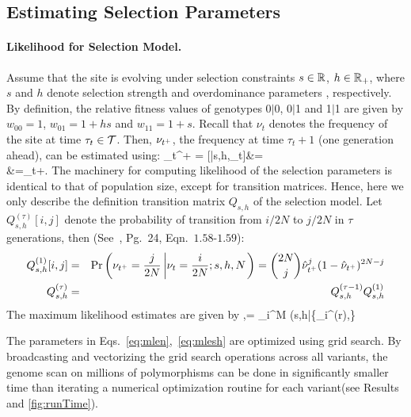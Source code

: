 \subsection{Estimating Selection Parameters}

\paragraph{Likelihood for Selection Model.}
Assume that the site is evolving under selection constraints $s\in
{\mathbb R}$, $h\in {\mathbb R}_+$, where $s$ and $h$ denote selection strength and 
overdominance parameters ,
respectively. By definition, the relative fitness values of genotypes
0$|$0, 0$|$1 and 1$|$1 are given by $w_{00}=1$, $w_{01}=1+hs$ and
$w_{11}=1+s$. Recall that $\nu_t$ denotes the frequency of the site at
time $\tau_t\in {\cal T}$. Then, $\nu_{t^+}$, the frequency at time
$\tau_{t}+1$ (one generation ahead), can be estimated using: 
\beq 
\hat{\nu}_{t^+} =
[\nusp|s,h,\nu_t]&=\\
&=\nu_t+.
  \label{eq:transition}
\eeq
The machinery for computing likelihood of the selection parameters is 
identical to that of population size, except for transition matrices. Hence, here 
we only describe the definition transition matrix $Q_{s,h}$ of the selection 
model.
Let $Q^{(\tau)}_{s,h}[i,j]$ denote the
probability of transition from ${i}/{2N}$ to ${j}/{2N}$ in
$\tau$ generations, then (See~\cite{Ewens2012Mathematical}, Pg.~24, 
Eqn.~$1.58$-$1.59$):
\begin{eqnarray}
  Q^{(1)}_{s,h}[i,j] &=& \operatorname{Pr}\left(\nu_{t^+}=\frac{j}{2N} \left\lvert
      \nu_{t}=\frac{i}{2N};s,h,N \right .\right)={2N \choose j}
  \hat{\nu}_{t^+}^{j} (1-\hat{\nu}_{t^+})^{2N-j}\label{eq:Q1}\\
  Q^{(\tau)}_{s,h} &=& Q^{(\tau-1)}_{s,h}Q^{(1)}_{s,h}\label{eq:Qt}
  \label{eq:mkvs}   
\end{eqnarray}
The maximum likelihood estimates are given by
\beq
\hs,\hh =  \prod_i^M \Lc(s,h|\{_i^{(r)},\hN\} 
\label{eq:mlesh}
\eeq

 The parameters in
 Eqs.~\ref{eq:mlen},~\ref{eq:mlesh} are optimized using grid
 search. By broadcasting and vectorizing the grid search operations
 across all variants, the genome scan on millions of polymorphisms can
 be done in significantly smaller time than iterating a numerical
 optimization routine for each variant(see Results and
 \ref{fig:runTime}).
